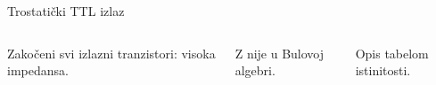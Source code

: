 \begin{frame}[label=10-s078]{Trostatički TTL izlaz}
\setlength{\abovedisplayskip}{4pt}\setlength{\belowdisplayskip}{4pt}\setlength{\abovedisplayshortskip}{3pt}\setlength{\belowdisplayshortskip}{3pt}
\begin{columns}[T,onlytextwidth]Zakočeni svi izlazni tranzistori: visoka impedansa.\par\smallskip{}\centering {}\smallskip\par\smallskip\par\smallskip\par\smallskip
Z nije u Bulovoj algebri.\par Opis tabelom istinitosti.\end{columns}
\end{frame}
